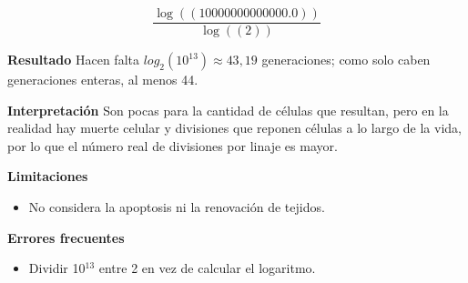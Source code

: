 \documentclass{book}
\begin{document}
\begin{tcolorbox}[title={Problema resuelto}, studiumworked, breakable]
\[
\frac{\log{\left(\left(10000000000000.0\right) \right)}}{\log{\left(\left(2\right) \right)}}
\]

\noindent\textbf{Resultado}
Hacen falta \(log_{2}(10^{13}) \approx 43,19\) generaciones; como solo caben generaciones enteras, al menos 44.


\noindent\textbf{Interpretación}
Son pocas para la cantidad de células que resultan, pero en la realidad hay muerte celular y divisiones que reponen células a lo largo de la vida, por lo que el número real de divisiones por linaje es mayor.


\noindent\textbf{Limitaciones}
\begin{itemize}
\item No considera la apoptosis ni la renovación de tejidos.
\end{itemize}

\noindent\textbf{Errores frecuentes}
\begin{itemize}
\item Dividir 10\({}^{13}\) entre 2 en vez de calcular el logaritmo.
\end{itemize}
\end{tcolorbox}
\end{document}
